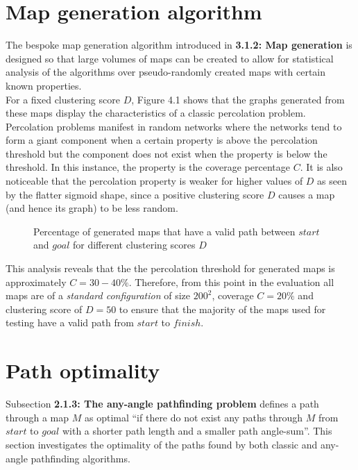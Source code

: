 \documentclass[12pt,notitlepage]{report}
\begin{document}
\section{Map generation algorithm}

The bespoke map generation algorithm introduced in {\bfseries 3.1.2: Map generation} is designed so that large volumes of maps can be created to allow for statistical analysis of the algorithms over pseudo-randomly created maps with certain known properties.\\

\noindent
For a fixed clustering score $D$, Figure 4.1 shows that the graphs generated from these maps display the characteristics of a classic percolation problem. Percolation problems manifest in random networks where the networks tend to form a giant component when a certain property is above the percolation threshold but the component does not exist when the property is below the threshold. In this instance, the property is the coverage percentage $C$. It is also noticeable that the percolation property is weaker for higher values of $D$ as seen by the flatter sigmoid shape, since a positive clustering score $D$ causes a map (and hence its graph) to be less random.\\

\begin{figure}
\centering

\caption{Percentage of generated maps that have a valid path between $start$ and $goal$ for different clustering scores $D$}
\end{figure}

\noindent
This analysis reveals that the the percolation threshold for generated maps is approximately $C=30-40\%$. Therefore, from this point in the evaluation all maps are of a {\em standard configuration} of size $200^{2}$, coverage $C=20\%$ and clustering score of $D=50$ to ensure that the majority of the maps used for testing have a valid path from $start$ to $finish$.

\section{Path optimality}

Subsection {\bfseries 2.1.3: The any-angle pathfinding problem} defines a path through a map $M$ as optimal ``if there do not exist any paths through $M$ from $start$ to $goal$ with a shorter path length and a smaller path angle-sum''. This section investigates the optimality of the paths found by both classic and any-angle pathfinding algorithms.\\
\end{document}

